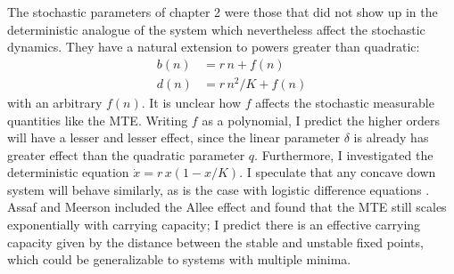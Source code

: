 \iffalse
In terms of the approximations covered in this thesis, not much more could be done, unless a new approximation technique is developed and needs testing. 
Biophysics as a field is dynamic and as such I would not be surprised if a new technique gains popularity in the next few years. 
Likely the technique already exists and has not made its way to our discipline. 
It could be in far from equilibrium condensed matter or high energy physics, it might be evolutionary game theory, or already commonly employed in linguistics, economics, graph theory, or the more mathematical side of stochastic processes. 
Martingales are soluble, so perhaps the next approach will be to map everything to a martingale or a convolution of martingales. 
Artificial intelligence is also trendy at the time of writing, and the many layered neural nets that are becoming available could easily be turned to stochastic processes, with each neuron representing one population state of the system. 
Current routinely used nets have millions of neurons, which corresponds to a carrying capacity of thousands. 
\fi

The stochastic parameters of chapter 2 were those that did not show up in the deterministic analogue of the system which nevertheless affect the stochastic dynamics. 
They have a natural extension to powers greater than quadratic:
\begin{align*}
	b(n) &= r\,n + f(n) \\
	d(n) &= r\,n^2/K + f(n)
\end{align*}
with an arbitrary $f(n)$. 
It is unclear how $f$ affects the stochastic measurable quantities like the MTE. 
Writing $f$ as a polynomial, I predict the higher orders will have a lesser and lesser effect, since the linear parameter $\delta$ is already has greater effect than the quadratic parameter $q$. 
Furthermore, I investigated the deterministic equation $\dot{x} = r\,x(1-x/K)$. I speculate that any concave down system will behave similarly, as is the case with logistic difference equations \cite{Strogatz1994}. 
Assaf and Meerson \cite{Assaf2016} included the Allee effect and found that the MTE still scales exponentially with carrying capacity; I predict there is an effective carrying capacity given by the distance between the stable and unstable fixed points, which could be generalizable to systems with multiple minima. 

